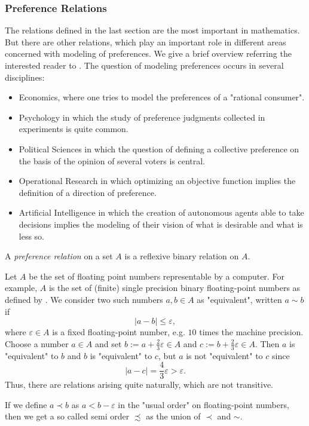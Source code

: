 ﻿\documentclass[a4paper,11pt,final]{article}
\numberwithin{equation}{subsection}
\begin{document}
\subsubsection{Preference Relations}
The relations defined in the last section are the most important in mathematics. But there are other relations, which play an important role in different areas concerned with modeling of preferences. We give a brief overview referring the interested reader to \cite{pref}. The question of modeling preferences occurs in several disciplines:
\begin{itemize}
\item Economics, where one tries to model the preferences of a "rational consumer".
\item Psychology in which the study of preference judgments collected in experiments is quite common.
\item Political Sciences in which the question of defining a collective preference on the basis of the opinion of several voters is central.
\item Operational Research in which optimizing an objective function implies the definition of a direction of preference.
\item Artificial Intelligence in which the creation of autonomous agents able to take decisions implies the modeling of their vision of what is desirable and what is less so.
\end{itemize}

\begin{defi}
A \emph{preference relation} on a set $A$ is a reflexive binary relation on $A$.
\end{defi}

\begin{exam}
Let $A$ be the set of floating point numbers representable by a computer. For example, $A$ is the set of (finite) single precision binary floating-point numbers as defined by \cite{ieee754}. We consider two such numbers $a,b\in A$ as "equivalent", written $a\sim b$ if
\begin{equation*}
\bigl|a-b\bigr|\le \varepsilon,
\end{equation*}
where $\varepsilon\in A$ is a fixed floating-point number, e.g. $10$ times the machine precision. Choose a number $a\in A$ and set $b:= a + \tfrac{2}{3}\varepsilon\in A$ and $c:= b + \tfrac{2}{3}\varepsilon\in A$. Then $a$ is "equivalent" to $b$ and $b$ is "equivalent" to $c$, but $a$ is not "equivalent" to $c$ since
\begin{equation*}
\bigl|a-c\bigr|= \dfrac{4}{3}\varepsilon>\varepsilon.
\end{equation*}
Thus, there are relations arising quite naturally, which are not transitive.\par
If we define $a\prec b$ as $a < b - \varepsilon$ in the "usual order" on floating-point numbers, then we get a so called semi order $\precsim$ as the union of $\prec$ and $\sim$.
\end{exam}
\end{document}
